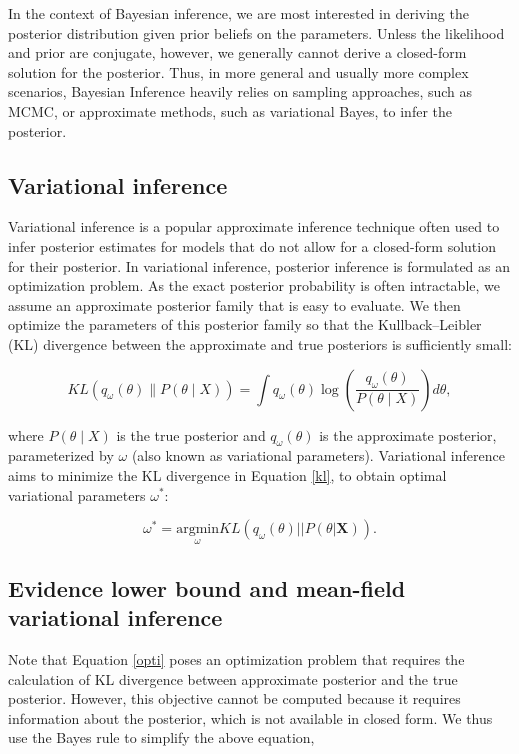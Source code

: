 %
In the context of Bayesian inference, we are most interested in deriving the posterior distribution given prior beliefs on the parameters.
%
Unless the likelihood and prior are conjugate, however, we generally cannot derive a closed-form solution for the posterior.
%
Thus, in more general and usually more complex scenarios, Bayesian Inference heavily relies on sampling approaches, such as MCMC, or approximate methods, such as variational Bayes, to infer the posterior.
\subsection{Variational inference}
Variational inference is a popular approximate inference technique often used to infer posterior estimates for models that do not allow for a closed-form solution for their posterior.
%
In variational inference, posterior inference is formulated as an optimization problem.
%
As the exact posterior probability is often intractable, we assume an approximate posterior family that is easy to evaluate.
%
We then optimize the parameters of this posterior family so that the Kullback–Leibler (KL) divergence between the approximate and true posteriors is sufficiently small:
%

\begin{equation}
    KL\left(q_{\omega} (\theta) \| P(\theta \mid X) \right) = \int q_{\omega} (\theta) \log \left( \frac{q_{\omega} (\theta)}{P(\theta \mid X)} \right) d \theta \label{kl},
\end{equation}

%
where $P(\theta \mid X)$ is the true posterior and $q_{\omega} (\theta)$ is the approximate posterior, parameterized by $\omega$ (also known as variational parameters).
%
Variational inference aims to minimize the KL divergence in Equation \ref{kl}, to obtain optimal variational parameters $\omega^{*}$: 

\begin{equation}
    \omega^{*} = \underset{\omega}{\mathrm{argmin}}KL(q_{\omega}(\theta)||P(\theta|\textbf{X})).
    \label{opti}
\end{equation}

\subsection{Evidence lower bound and mean-field variational inference}
\label{sec:ch4-theory-mfvi}
Note that Equation \ref{opti} poses an optimization problem that requires the calculation of KL divergence between approximate posterior and the true posterior.
%
However, this objective cannot be computed because it requires information about the posterior, which is not available in closed form.
%
We thus use the Bayes rule to simplify the above equation,
%

